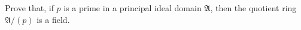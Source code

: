 Prove that, if $p$ is a prime in a principal ideal domain $\mathfrak{A}$, then the quotient ring $\mathfrak{A}/(p)$ is a field.